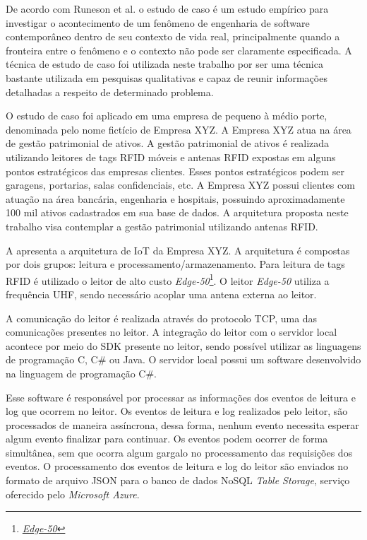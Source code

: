 \label{cap:estudo-caso}

De acordo com Runeson et al. \cite{Runeson2012CaseEngineering} o estudo de caso é um estudo empírico para investigar o acontecimento de um fenômeno de engenharia de software contemporâneo dentro de seu contexto de vida real, principalmente quando a fronteira entre o fenômeno e o contexto não pode ser claramente especificada. A técnica de estudo de caso foi utilizada neste trabalho por ser uma técnica bastante utilizada em pesquisas qualitativas e capaz de reunir informações detalhadas a respeito de determinado problema.

O estudo de caso foi aplicado em uma empresa de pequeno à médio porte, denominada pelo nome fictício de Empresa XYZ. A Empresa XYZ atua na área de gestão patrimonial de ativos. A gestão patrimonial de ativos é realizada utilizando leitores de tags RFID móveis e antenas RFID expostas em alguns pontos estratégicos das empresas clientes. Esses pontos estratégicos podem ser garagens, portarias, salas confidenciais, etc. A Empresa XYZ possui clientes com atuação na área bancária, engenharia e hospitais, possuindo aproximadamente 100 mil ativos cadastrados em sua base de dados. A arquitetura proposta neste trabalho visa contemplar a gestão patrimonial utilizando antenas RFID.

A  apresenta a arquitetura de \acrshort{IoT} da Empresa XYZ. A arquitetura é compostas por dois grupos: leitura e processamento/armazenamento. Para leitura de tags \acrshort{RFID} é utilizado o leitor de alto custo \textit{Edge-50}\footnote{\emph{\href{http://activa-id.com.br/produto/leitor-rfid-uhf-edge-50}{Edge-50}}}. O leitor \textit{Edge-50} utiliza a frequência \acrshort{UHF}, sendo necessário acoplar uma antena externa ao leitor.

A comunicação do leitor é realizada através do protocolo \acrshort{TCP}, uma das comunicações presentes no leitor. A integração do leitor com o servidor local acontece por meio do \acrshort{SDK} presente no leitor, sendo possível utilizar as linguagens de programação C, C\# ou Java. O servidor local possui um software desenvolvido na linguagem de programação C\#.

Esse software é responsável por processar as informações dos eventos de leitura e log que ocorrem no leitor. Os eventos de leitura e log realizados pelo leitor, são processados de maneira assíncrona, dessa forma, nenhum evento necessita esperar algum evento finalizar para continuar. Os eventos podem ocorrer de forma simultânea, sem que ocorra algum gargalo no processamento das requisições dos eventos. O processamento dos eventos de leitura e log do leitor são enviados no formato de arquivo \acrshort{JSON} para o banco de dados \acrshort{NoSQL} \textit{Table Storage}, serviço oferecido pelo \textit{Microsoft Azure}.

